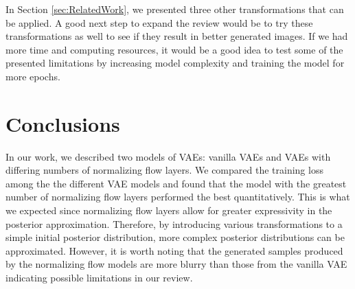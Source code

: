 \documentclass{article}
\begin{document}
In Section \ref{sec:RelatedWork}, we presented three other transformations that can be applied. 
A good next step to expand the review would be to try these transformations as well to see if they 
result in better generated images. If we had more time and computing resources, it would be a good 
idea to test some of the presented limitations by increasing model complexity and training the model 
for more epochs.

\section{Conclusions}
In our work, we described two models of VAEs: vanilla VAEs and VAEs with differing numbers of
normalizing flow layers.  We compared the training loss among the the different VAE models and found
that the model with the greatest number of normalizing flow layers performed the best quantitatively.  
This is what we expected since normalizing flow layers allow for greater expressivity in the posterior 
approximation. Therefore, by introducing various transformations to a simple initial posterior distribution, 
more complex posterior distributions can be approximated. However, it is worth noting that the generated 
samples produced by the normalizing flow models are more blurry than those from the vanilla VAE 
indicating possible limitations in our review.


\small
%


\end{document}
